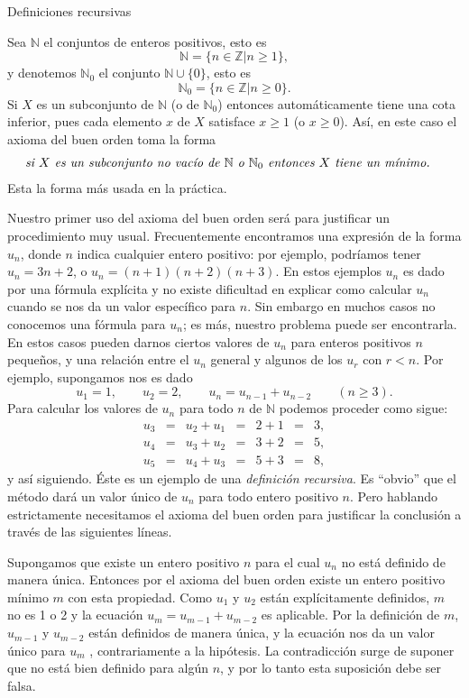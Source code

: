 \documentclass[11pt,spanish,makeidx]{amsbook}
\theoremstyle{definition}
\theoremstyle{remark}
\begin{document}
\begin{section}{Definiciones recursivas}\label{1.3}

Sea $\mathbb N$ el conjuntos de enteros positivos, esto es
$$
\mathbb N = \{ n \in \mathbb Z | n\ge 1\},
$$
y denotemos $\mathbb N_0$ el conjunto $\mathbb N \cup \{0\}$, esto
es
$$
\mathbb N_0 = \{ n \in \mathbb Z | n\ge 0\}.
$$
Si $X$ es un subconjunto de $\mathbb N$ (o de $\mathbb N_0$)  entonces automáticamente tiene una cota inferior, pues cada elemento $x$ de $X$ satisface $x\ge 1$ (o $x\ge 0$). As{í}, en este caso el axioma del buen orden toma la forma
$$
\begin{aligned}
&\text{\it si $X$ es un subconjunto no vacío de $\mathbb N$ o $\mathbb N_0$ entonces $X$  tiene un mínimo.}
\end{aligned}
$$
Esta la forma más usada en la práctica.

Nuestro primer uso del axioma del buen orden será para justificar un procedimiento muy usual. Frecuentemente encontramos una expresión de la forma $u_n$, donde $n$ indica cualquier entero positivo: por ejemplo, podríamos tener $u_n=3n+2$, o $u_n = (n+1)(n+2)(n+3)$. En estos ejemplos $u_n$ es dado por una fórmula explícita y no existe dificultad en explicar como calcular $u_n$ cuando se nos da un valor específico para $n$. Sin embargo en muchos casos no conocemos una fórmula para $u_n$; es más, nuestro problema puede ser encontrarla. En estos casos pueden darnos ciertos valores de $u_n$ para enteros positivos $n$ peque\~nos, y una relación entre el $u_n$ general y algunos de los $u_r$ con $r<n$. Por ejemplo, supongamos nos es dado 
$$
u_1=1, \qquad u_2=2, \qquad u_n =u_{n-1} +u_{n-2} \qquad (n\ge 3).
$$
Para calcular los valores de $u_n$ para todo $n$ de $\mathbb N$ podemos proceder como sigue:
$$
\begin{matrix}
u_3 & = & u_2 + u_1 & = & 2+1 &=& 3, \\
u_4 & = & u_3 + u_2 & = & 3+2 &=& 5, \\
u_5 & = & u_4 + u_3 & = & 5+3 &=& 8,
\end{matrix}
$$
y así siguiendo.  Éste es un ejemplo de una {\it definición recursiva}. Es ``obvio'' que el método dará un valor único de $u_n$ para todo entero positivo $n$. Pero hablando estrictamente necesitamos el axioma del buen orden para justificar la conclusión a través de las siguientes líneas.

Supongamos que existe un entero positivo $n$ para el cual $u_n$ no está definido de manera única. Entonces por el axioma del buen orden existe un entero positivo mínimo $m$ con esta propiedad. Como $u_1$ y $u_2$ están explícitamente definidos, $m$ no es 1 o 2 y la ecuación $u_m =u_{m-1} +u_{m-2}$ es aplicable. Por la definición de $m$, $u_{m-1}$ y $u_{m-2}$ están definidos de manera única, y la ecuación nos da un valor único para $u_m$ , contrariamente a la hipótesis. La contradicción surge de suponer que no está bien definido para algún $n$, y por lo tanto esta suposición debe ser falsa.


\end{section}
\end{document}
